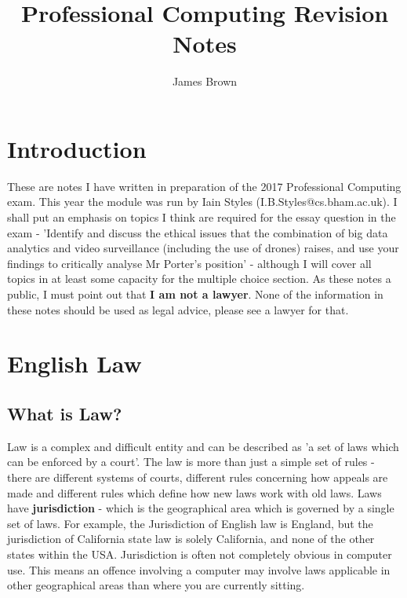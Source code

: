 \documentclass{article}
\title{Professional Computing \linebreak Revision Notes}
\author{James Brown}
\begin{document}
	\maketitle
	\newpage
	\tableofcontents
	\newpage
	
	\section{Introduction}
	These are notes I have written in preparation of the 2017 Professional Computing exam. This year the module was run by Iain Styles (I.B.Styles@cs.bham.ac.uk). I shall put an emphasis on topics I think are required for the essay question in the exam - 'Identify and discuss the ethical issues that the combination of big data analytics and video surveillance (including the use of drones) raises, and use your findings to critically analyse Mr Porter's position' - although I will cover all topics in at least some capacity for the multiple choice section.  As these notes a public, I must point out that \textbf{I am not a lawyer}. None of the information in these notes should be used as legal advice, please see a lawyer for that.
	
	\section{English Law}
	\subsection{What is Law?}
	Law is a complex and difficult entity and can be described as 'a set of laws which can be enforced by a court'. The law is more than just a simple set of rules - there are different systems of courts, different rules concerning how appeals are made and different rules which define how new laws work with old laws. Laws have \textbf{jurisdiction} - which is the geographical area which is governed by a single set of laws. For example, the Jurisdiction of English law is England, but the jurisdiction of California state law is solely California, and none of the other states within the USA. Jurisdiction is often not completely obvious in computer use. This means an offence involving a computer may involve laws applicable in other geographical areas than where you are currently sitting.
\end{document}
